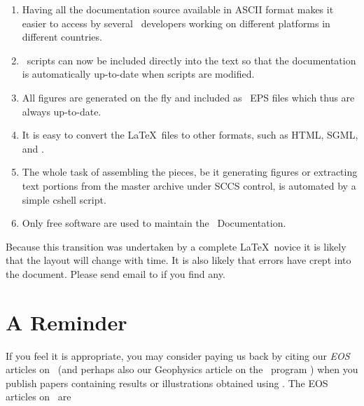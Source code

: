 \begin{enumerate}

\item Having all the documentation source available in
ASCII format makes it easier to access by several
\GMT\ developers working on different platforms in 
different countries.

\item \GMT\ scripts can now be included directly into the text
so that the documentation is automatically up-to-date
when scripts are modified.

\item All figures are generated on the fly and included as
\GMT\ EPS files which thus are always up-to-date.

\item It is easy to convert the \LaTeX\ files to other
formats, such as HTML, SGML, and \PS.

\item The whole task of assembling the pieces, be it generating
figures or extracting text portions from the master archive under
SCCS control, is automated by a simple cshell script.

\item Only free software are used to maintain the \GMT\ Documentation.

\end{enumerate}

Because this transition was undertaken by a complete \LaTeX\ novice
it is likely that the layout will change with time.  It is also
likely that errors have crept into the document.  Please send email
to 
if you find any.


\chapter*{A Reminder}

If you feel it is appropriate, you may consider paying us back by
citing our {\it EOS} articles on \GMT\ (and perhaps also our Geophysics
article on the \GMT\ program ) when you publish papers
containing results or illustrations obtained using \GMT.  The EOS
articles on \GMT\ are \\
%
%


